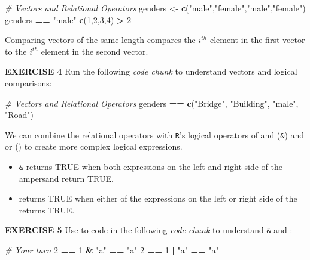 \documentclass[
]{article}
\newenvironment{Shaded}{\begin{snugshade}}{\end{snugshade}}
\newcommand{\CommentTok}[1]{\textcolor[rgb]{0.56,0.35,0.01}{\textit{#1}}}
\newcommand{\DecValTok}[1]{\textcolor[rgb]{0.00,0.00,0.81}{#1}}
\newcommand{\KeywordTok}[1]{\textcolor[rgb]{0.13,0.29,0.53}{\textbf{#1}}}
\newcommand{\NormalTok}[1]{#1}
\newcommand{\OperatorTok}[1]{\textcolor[rgb]{0.81,0.36,0.00}{\textbf{#1}}}
\newcommand{\StringTok}[1]{\textcolor[rgb]{0.31,0.60,0.02}{#1}}
\providecommand{\tightlist}{%
  \setlength{\itemsep}{0pt}\setlength{\parskip}{0pt}}
\begin{document}
\begin{Shaded}
\begin{Highlighting}[]
\CommentTok{# Vectors and Relational Operators}
\NormalTok{genders <-}\StringTok{ }\KeywordTok{c}\NormalTok{(}\StringTok{"male"}\NormalTok{,}\StringTok{"female"}\NormalTok{,}\StringTok{"male"}\NormalTok{,}\StringTok{"female"}\NormalTok{)}
\NormalTok{genders }\OperatorTok{==}\StringTok{ "male"}
\KeywordTok{c}\NormalTok{(}\DecValTok{1}\NormalTok{,}\DecValTok{2}\NormalTok{,}\DecValTok{3}\NormalTok{,}\DecValTok{4}\NormalTok{) }\OperatorTok{>}\StringTok{ }\DecValTok{2}
\end{Highlighting}
\end{Shaded}

Comparing vectors of the same length compares the \(i^{th}\) element in
the first vector to the \(i^{th}\) element in the second vector.

\textbf{EXERCISE 4} Run the following \emph{code chunk} to understand
vectors and logical comparisons:

\begin{Shaded}
\begin{Highlighting}[]
\CommentTok{# Vectors and Relational Operators}
\NormalTok{genders }\OperatorTok{==}\StringTok{ }\KeywordTok{c}\NormalTok{(}\StringTok{"Bridge"}\NormalTok{, }\StringTok{"Building"}\NormalTok{, }\StringTok{"male"}\NormalTok{, }\StringTok{"Road"}\NormalTok{)}
\end{Highlighting}
\end{Shaded}

We can combine the relational operators with \texttt{R}'s logical
operators of and (\texttt{\&}) and or (\texttt{\textbar{}}) to create
more complex logical expressions.

\begin{itemize}
\tightlist
\item
  \texttt{\&} returns TRUE when both expressions on the left and right
  side of the ampersand return TRUE.
\item
  \texttt{\textbar{}} returns TRUE when either of the expressions on the
  left or right side of the \texttt{\textbar{}} returns TRUE.
\end{itemize}

\textbf{EXERCISE 5} Use to code in the following \emph{code chunk} to
understand \texttt{\&} and \texttt{\textbar{}}:

\begin{Shaded}
\begin{Highlighting}[]
\CommentTok{# Your turn}
\DecValTok{2} \OperatorTok{==}\StringTok{ }\DecValTok{1} \OperatorTok{&}\StringTok{ "a"} \OperatorTok{==}\StringTok{ "a"}
\DecValTok{2} \OperatorTok{==}\StringTok{ }\DecValTok{1} \OperatorTok{|}\StringTok{ "a"} \OperatorTok{==}\StringTok{ "a"}
\end{Highlighting}
\end{Shaded}
\end{document}
